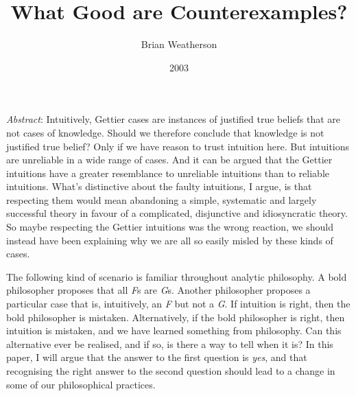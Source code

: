 \documentclass[
  11pt,
  letterpaper,
  DIV=11,
  numbers=noendperiod,
  twoside]{scrartcl}
\title{What Good are Counterexamples?}
\author{Brian Weatherson}
\date{2003}
\renewenvironment{abstract}
 {\vspace{-1.25cm}
 \quotation\small\noindent\emph{Abstract}:}
 {\endquotation}
\begin{document}
\maketitle
\begin{abstract}
Intuitively, Gettier cases are instances of justified true beliefs that
are not cases of knowledge. Should we therefore conclude that knowledge
is not justified true belief? Only if we have reason to trust intuition
here. But intuitions are unreliable in a wide range of cases. And it can
be argued that the Gettier intuitions have a greater resemblance to
unreliable intuitions than to reliable intuitions. What's distinctive
about the faulty intuitions, I argue, is that respecting them would mean
abandoning a simple, systematic and largely successful theory in favour
of a complicated, disjunctive and idiosyncratic theory. So maybe
respecting the Gettier intuitions was the wrong reaction, we should
instead have been explaining why we are all so easily misled by these
kinds of cases.
\end{abstract}


The following kind of scenario is familiar throughout analytic
philosophy. A bold philosopher proposes that all \emph{F}s are
\emph{G}s. Another philosopher proposes a particular case that is,
intuitively, an \emph{F} but not a \emph{G}. If intuition is right, then
the bold philosopher is mistaken. Alternatively, if the bold philosopher
is right, then intuition is mistaken, and we have learned something from
philosophy. Can this alternative ever be realised, and if so, is there a
way to tell when it is? In this paper, I will argue that the answer to
the first question is \emph{yes}, and that recognising the right answer
to the second question should lead to a change in some of our
philosophical practices.
\end{document}
